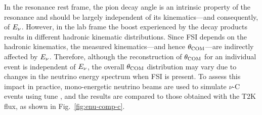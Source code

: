      In the resonance rest frame, the pion decay angle is an intrinsic property of the resonance and should be largely independent of its kinematics—and consequently, of $E_{\nu}$.
     However, in the lab frame the boost experienced by the decay products results in different hadronic kinematic distributions.
     Since FSI depends on the hadronic kinematics, the measured kinematics—and hence $\theta_{\textrm{COM}}$—are indirectly affected by $E_{\nu}$.
     Therefore, although the reconstruction of $\theta_{\textrm{COM}}$ for an individual event is independent of $E_{\nu}$, the overall $\theta_{\textrm{COM}}$ distribution may vary due to changes in the neutrino energy spectrum when FSI is present.
     To assess this impact in practice, mono-energetic neutrino beams are used to simulate $\nu$-C events using tune \gZero, and the results are compared to those obtained with the T2K flux, as shown in Fig.~\ref{fig:enu-comp-c}.
